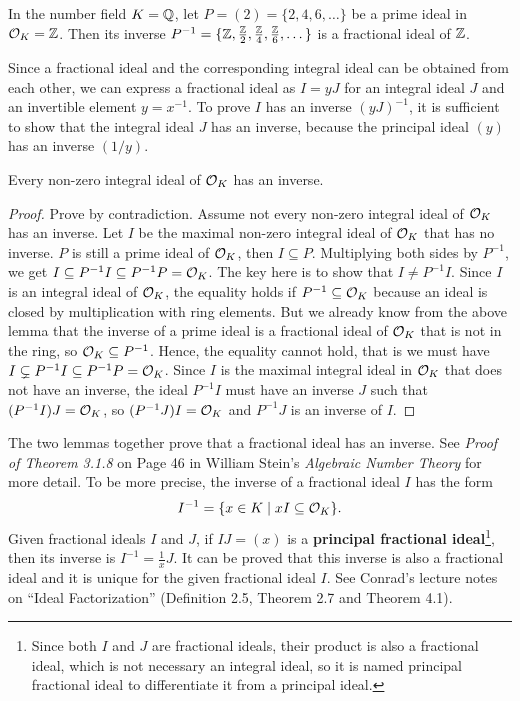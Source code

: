 \documentclass[../main.tex]{subfiles}
\begin{document}
\begin{example}
In the number field $K = \mathbb{Q}$, let $P = (2) = \{2, 4, 6, \dots\}$ be a prime ideal in $\mathcal{O}_K = \mathbb{Z}$. Then its inverse $P^{-1} = \{\mathbb{Z}, \frac{\mathbb{Z}}{2}, \frac{\mathbb{Z}}{4}, \frac{\mathbb{Z}}{6}, \dots\}$ is a fractional ideal of $\mathbb{Z}$. 
\end{example}

Since a fractional ideal and the corresponding integral ideal can be obtained from each other, we can express a fractional ideal as $I=yJ$ for an integral ideal $J$ and an invertible element $y=x^{-1}$. To prove $I$ has an inverse $(yJ)^{-1}$, it is sufficient to show that the integral ideal $J$ has an inverse, because the principal ideal $(y)$ has an inverse $(1/y)$. 

\begin{lemma}
\reversemarginpar
{}
Every non-zero integral ideal of $\mathcal{O}_K$ has an inverse. 
\end{lemma}
\begin{proof}
Prove by contradiction. Assume not every non-zero integral ideal of $\mathcal{O}_K$ has an inverse. Let $I$ be the maximal non-zero integral ideal of $\mathcal{O}_K$ that has no inverse. $P$ is still a prime ideal of $\mathcal{O}_K$, then $I \subseteq P$. Multiplying both sides by $P^{-1}$, we get $I \subseteq P^{-1} I \subseteq P^{-1} P = \mathcal{O}_K$. The key here is to show that $I \neq P^{-1} I$. Since $I$ is an integral ideal of $\mathcal{O}_K$, the equality holds if $P^{-1} \subseteq \mathcal{O}_K$ because an ideal is closed by multiplication with ring elements. But we already know from the above lemma that the inverse of a prime ideal is a fractional ideal of $\mathcal{O}_K$ that is not in the ring, so $\mathcal{O}_K \subseteq P^{-1}$. Hence, the equality cannot hold, that is we must have $I \subsetneq P^{-1} I \subseteq P^{-1} P = \mathcal{O}_K$. Since $I$ is the maximal integral ideal in $\mathcal{O}_K$ that does not have an inverse, the ideal $P^{-1} I$ must have an inverse $J$ such that $(P^{-1} I)J=\mathcal{O}_K$, so $(P^{-1} J)I=\mathcal{O}_K$ and $P^{-1}J$ is an inverse of $I$. 
\end{proof}

The two lemmas together prove that a fractional ideal has an inverse. 
See \textit{Proof of Theorem 3.1.8} on Page 46 in William Stein's \textit{Algebraic Number Theory} for more detail. To be more precise, the inverse 
\reversemarginpar
{}
of a fractional ideal $I$ has the form 
\begin{equation}
\label{app equ:fracIdInv}
    I^{-1} = \{x \in K \mid xI \subseteq \mathcal{O}_K\}.
\end{equation}
Given fractional ideals $I$ and $J$, if $IJ=(x)$ is a \textbf{principal fractional ideal}\footnote{Since both $I$ and $J$ are fractional ideals, their product is also a fractional ideal, which is not necessary an integral ideal, so it is named principal fractional ideal to differentiate it from a principal ideal.}, then its inverse is $I^{-1}=\frac{1}{x}J$.
It can be proved that this inverse is also a fractional ideal and it is unique for the given fractional ideal $I$. See Conrad's lecture notes on ``Ideal Factorization'' (Definition 2.5, Theorem 2.7 and Theorem 4.1). 
\end{document}
